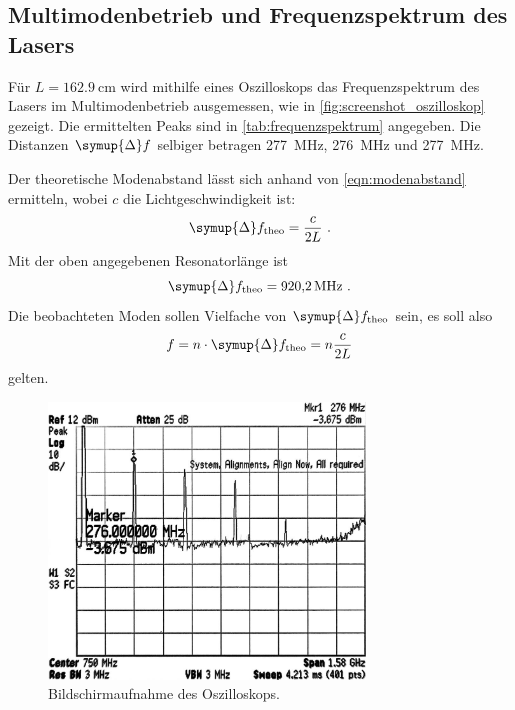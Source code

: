 \subsection{Multimodenbetrieb und Frequenzspektrum des Lasers}
\label{sec:auswertung:frequenzspektrum}
Für $L = \SI{162.9}{\centi\meter}$ wird mithilfe eines Oszilloskops das Frequenzspektrum des Lasers im Multimodenbetrieb ausgemessen,
wie in \autoref{fig:screenshot_oszilloskop} gezeigt.
Die ermittelten Peaks sind in \autoref{tab:frequenzspektrum} angegeben.
Die Distanzen $\symup{\Delta}f$ selbiger betragen
\SI{277}{\mega\hertz},
\SI{276}{\mega\hertz} und
\SI{277}{\mega\hertz}.

Der theoretische Modenabstand lässt sich anhand von \autoref{eqn:modenabstand} ermitteln,
wobei $c$ die Lichtgeschwindigkeit ist:
\begin{equation}
  \symup{\Delta}f_\text{theo} = \frac{c}{2L} \ .
  \label{eqn:modenabstand}
\end{equation}
Mit der oben angegebenen Resonatorlänge ist
\[
  \symup{\Delta}f_\text{theo} = \SI{920.2}{\mega\hertz} \ .
\]
Die beobachteten Moden sollen Vielfache von $\symup{\Delta}f_\text{theo}$ sein,
es soll also
\[
  f = n \cdot \symup{\Delta}f_\text{theo} = n\frac{c}{2L}
\]
gelten.


\begin{figure}
  \centering
   \includegraphics[width=0.75\textwidth]{content/img/5_frequenzspektrum_oszilloskop_inverted.jpg}
   \caption{Bildschirmaufnahme des Oszilloskops.}
   \label{fig:screenshot_oszilloskop}
\end{figure}

